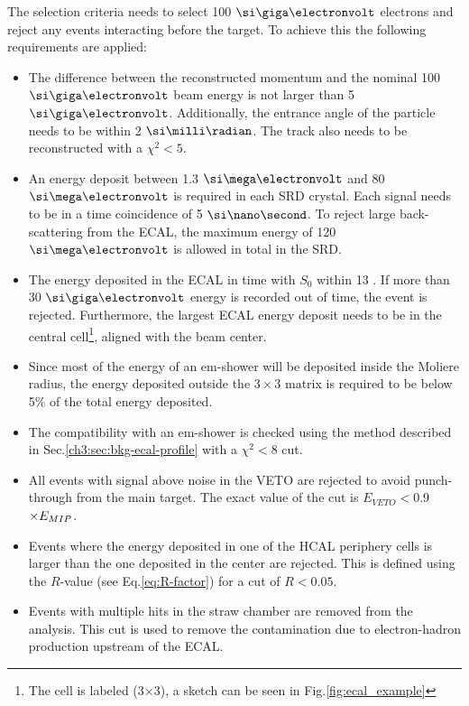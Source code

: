 
The selection criteria needs to select 100 $\gev$ electrons and reject any events interacting before the target.
To achieve this the following requirements are applied:

\begin{itemize}
\item The difference between the reconstructed momentum and the nominal 100 $\gev$ beam energy is not larger than 5 $\gev$. Additionally, the entrance angle of the particle needs to be within 2 $\mrad$. The track also needs to be reconstructed with a $\chi^2<5$.
\item An energy deposit between 1.3 $\mev$ and 80 $\mev$ is required in each SRD crystal. Each signal needs to be in a time coincidence of 5 $\nas$. To reject large back-scattering from the ECAL, the maximum energy of 120 $\mev$ is allowed in total in the SRD.
\item The energy deposited in the ECAL in time with $S_0$ within 13 \nas. If more than 30 $\gev$ energy is recorded out of time, the event is rejected. Furthermore, the largest ECAL energy deposit needs to be in the central cell\footnote{The cell is labeled (3$\times$3), a sketch can be seen in Fig.\ref{fig:ecal_example}}, aligned with the beam center. 
\item Since most of the energy of an em-shower will be deposited inside the Moliere radius, the energy deposited outside the $3\times3$ matrix is required to be below 5\% of the total energy deposited. 
\item The compatibility with an em-shower is checked using the method described in Sec.\ref{ch3:sec:bkg-ecal-profile} with a $\chi^2 < 8$ cut.
\item All events with signal above noise in the VETO are rejected to avoid punch-through from the main target. The exact value of the cut is $E_{VETO} <$0.9$\times E_{MIP}$.
\item Events where the energy deposited in one of the HCAL periphery cells is larger than the one deposited in the center are rejected. This is defined using the $R$-value (see Eq.\ref{eq:R-factor}) for a cut of $R < 0.05$.
\item Events with multiple hits in the straw chamber are removed from the analysis. This cut is used to remove the contamination due to electron-hadron production upstream of the ECAL.
\end{itemize}

